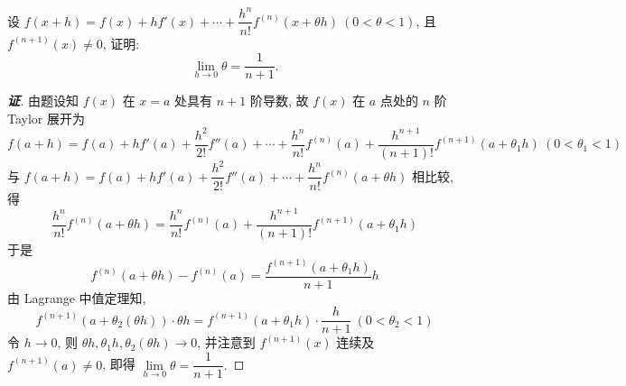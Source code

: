 \begin{example}
    设 $f(x+h)=f(x)+hf'(x)+\cdots+\dfrac{h^n}{n!}f^{(n)}(x+\theta h)~ (0<\theta<1)$, 且 $f^{(n+1)}(x)\neq 0$, 
    证明: $$\lim\limits_{h\to0}\theta =\dfrac{1}{n+1}.$$
\end{example}
\begin{proof}[{\songti \textbf{证}}]
    由题设知 $f(x)$ 在 $x=a$ 处具有 $n+1$ 阶导数, 故 $f(x)$ 在 $a$ 点处的 $n$ 阶 Taylor 展开为
    $$f\left( a+h\right) =f(a) +hf'(a) +\dfrac{h^{2}}{2!}f''(a) +\cdots +\dfrac{h^{n}}{n!}f^{(n) }(a) +\dfrac{h^{n+1}}{(n+1)  !}f^{(n+1)  }(a+\theta_1 h)~ (0<\theta_1<1)$$
    与 $f\left( a+h\right) =f(a) +hf'(a) +\dfrac{h^{2}}{2!}f''(a) +\cdots +\dfrac{h^{n}}{n!}f^{(n) }\left( a+\theta h\right) $ 相比较, 得
    $$\dfrac{h^{n}}{n!}f^{(n) }\left( a+\theta h\right) =\dfrac{h^{n}}{n!}f^{(n) }(a) +\dfrac{h^{n+1}}{(n+1)  !}f^{(n+1)  }\left( a+\theta _{1}h\right) $$
    于是 $$f^{(n) }\left( a+\theta h\right) -f^{(n) }(a) =\dfrac{f^{(n+1)  }\left( a+\theta _{1}h\right) }{n+1}h$$
    由 Lagrange 中值定理知, 
    $$f^{(n+1)  }\left( a+\theta _{2}\left( \theta h\right) \right) \cdot \theta h=f^{(n+1)  }\left( a+\theta _{1}h\right) \cdot \dfrac{h}{n+1}~ ( 0 <\theta _{2} < 1) $$
    令 $h\to0$, 则 $\theta h,\theta_1 h,\theta_2(\theta h)\to0$, 并注意到 $f^{(n+1)}(x)$ 连续及 $f^{(n+1)}(a)\neq 0$, 即得 $\lim\limits_{h\to0}\theta =\dfrac{1}{n+1}.$
\end{proof}

